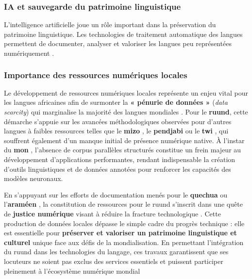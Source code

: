 \subsubsection{IA et sauvegarde du patrimoine linguistique}

L'intelligence artificielle joue un rôle important dans la préservation du patrimoine linguistique. Les technologies de traitement automatique des langues permettent de documenter, analyser et valoriser les langues peu représentées numériquement \cite{ranathunga2023neural, agyei2025dynamic}.

\subsubsection{Importance des ressources numériques locales}

Le développement de ressources numériques locales représente un enjeu vital pour les langues africaines afin de surmonter la \textbf{« pénurie de données »} (\textit{data scarcity}) qui marginalise la majorité des langues mondiales \cite{ranathunga2023neural}. Pour le \textbf{ruund}, cette démarche s'appuie sur les avancées méthodologiques observées pour d'autres langues à faibles ressources telles que le \textbf{mizo} \cite{haulai2023construction, lalrempuii2021improved}, le \textbf{pendjabi} \cite{jindal2017building} ou le \textbf{twi} \cite{agyei2024low}, qui souffrent également d'un manque initial de présence numérique native. À l'instar du \textbf{mon} \cite{tun2025exploring}, l'absence de corpus parallèles structurés constitue un frein majeur au développement d'applications performantes, rendant indispensable la création d'outils linguistiques et de données annotées pour renforcer les capacités des modèles neuronaux.

En s'appuyant sur les efforts de documentation menés pour le \textbf{quechua} \cite{sullatores2024desarrollo} ou l'\textbf{araméen} \cite{liebeskind2024machine}, la constitution de ressources pour le ruund s'inscrit dans une quête de \textbf{justice numérique} visant à réduire la fracture technologique \cite{ranathunga2023neural, agyei2024low}. Cette production de données locales dépasse le simple cadre du progrès technique : elle est essentielle pour \textbf{préserver et valoriser un patrimoine linguistique et culturel} unique face aux défis de la mondialisation. En permettant l'intégration du ruund dans les technologies du langage, ces travaux garantissent que ses locuteurs ne soient pas exclus des services essentiels et puissent participer pleinement à l'écosystème numérique mondial


